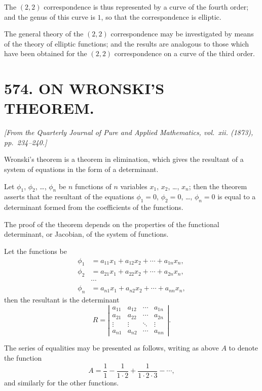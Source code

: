 \documentclass[11pt,a4paper]{article}
\theoremstyle{plain}
\theoremstyle{definition}
\theoremstyle{remark}
\newcommand{\paper}[2]{\section*{#1 #2}}
\newcommand{\papersource}[1]{\par\noindent\textit{#1}\par\medskip}
\begin{document}
The $(2,2)$ correspondence is thus represented by a curve of the fourth order; and the genus of this curve is $1$, so that the correspondence is elliptic.

The general theory of the $(2,2)$ correspondence may be investigated by means of the theory of elliptic functions; and the results are analogous to those which have been obtained for the $(2,2)$ correspondence on a curve of the third order.

\newpage
\paper{574.}{ON WRONSKI'S THEOREM.}

\papersource{[From the Quarterly Journal of Pure and Applied Mathematics, vol.~xii. (1873), pp.~234--240.]}

Wronski's theorem is a theorem in elimination, which gives the resultant of a system of equations in the form of a determinant.

Let $\phi_1$, $\phi_2$, \ldots, $\phi_n$ be $n$ functions of $n$ variables $x_1$, $x_2$, \ldots, $x_n$; then the theorem asserts that the resultant of the equations $\phi_1 = 0$, $\phi_2 = 0$, \ldots, $\phi_n = 0$ is equal to a determinant formed from the coefficients of the functions.

The proof of the theorem depends on the properties of the functional determinant, or Jacobian, of the system of functions.

\newpage

Let the functions be
\begin{align*}
\phi_1 &= a_{11}x_1 + a_{12}x_2 + \cdots + a_{1n}x_n, \\
\phi_2 &= a_{21}x_1 + a_{22}x_2 + \cdots + a_{2n}x_n, \\
&\cdots \\
\phi_n &= a_{n1}x_1 + a_{n2}x_2 + \cdots + a_{nn}x_n,
\end{align*}
then the resultant is the determinant
\[
R = \left| \begin{array}{cccc}
a_{11} & a_{12} & \cdots & a_{1n} \\
a_{21} & a_{22} & \cdots & a_{2n} \\
\vdots & \vdots & \ddots & \vdots \\
a_{n1} & a_{n2} & \cdots & a_{nn}
\end{array} \right|.
\]

The series of equalities may be presented as follows, writing as above $A$ to denote the function
\[
A = \frac{1}{1} - \frac{1}{1\cdot 2} + \frac{1}{1\cdot 2\cdot 3} - \cdots,
\]
and similarly for the other functions.
\end{document}
